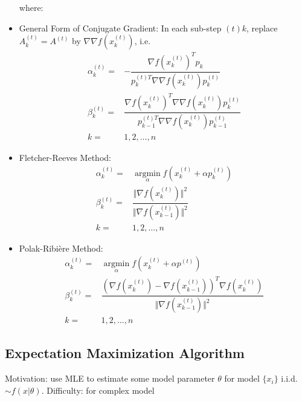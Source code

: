 \begin{itemize}[topsep=2pt,itemsep=0pt]
    where:
    \item General Form of Conjugate Gradient: In each sub-step $ (t)k $, replace $ A^{(t)}_k=A^{(t)} $ by $ \nabla\nabla f\left(x^{(t)}_k\right) $, i.e.
    \begin{align}
        \alpha _{k}^{(t)}=&-\dfrac{\nabla f(x^{(t)}_k)^Tp _k}{p^{(t)T} _{k}\nabla\nabla f(x^{(t)}_{k})p ^{(t)}_{k}}\\
        \beta _k^{(t)}=&\dfrac{\nabla f(x_k^{(t)})^T\nabla\nabla f(x_k^{(t)})p_k^{(t)}}{p^{(t)T} _{k-1}\nabla\nabla f(x^{(t)}_k)p ^{(t)}_{k-1}}\\
        k=&1,2,\ldots ,n
    \end{align}
    
    \item Fletcher-Reeves Method:
    \begin{align}
        \alpha _k^{(t)}=&\mathop{\arg\min}\limits_{\alpha }f\left(x^{(t)}_k+\alpha p^{(t)}_k\right) \\
        \beta _k^{(t)}=&\dfrac{\Vert \nabla f(x_k^{(t)}) \Vert^2 }{ \Vert \nabla f(x_{k-1}^{(t)}) \Vert ^2}\\
        k=&1,2,\ldots ,n
    \end{align}
    \item Polak-Ribi\`ere Method:
    \begin{align}
        \alpha _k^{(t)}=&\mathop{\arg\min}\limits_{\alpha }f\left(x^{(t)}_k+\alpha p^{(t)}\right)\\
        \beta_k^{(t)}=&\dfrac{\left(\nabla f(x_k^{(t)})-\nabla f(x_{k-1}^{(t)})\right)^T\nabla f(x_k^{(t)})}{\Vert \nabla f(x_{k-1}^{(t)}) \Vert^2 }\\
        k=&1,2,\ldots ,n
    \end{align}
        
\end{itemize}

    








\subsection{Expectation Maximization Algorithm}\label{SubSectionExpectationMaximumAlgorithm}
    Motivation: use MLE to estimate some model parameter $ \theta  $ for model $ \{x_i\}$ i.i.d. $ \sim f(x|\theta ) $. Difficulty: for complex model

